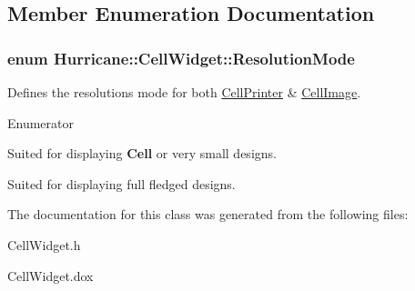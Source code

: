 \subsection{Member Enumeration Documentation}
\hypertarget{classHurricane_1_1CellWidget_a4b81fed78775d491c169b649870d9dd7}{
\subsubsection[{Resolution\-Mode}]{\setlength{\rightskip}{0pt plus 5cm}enum {\bf Hurricane\-::\-Cell\-Widget\-::\-Resolution\-Mode}}}\label{classHurricane_1_1CellWidget_a4b81fed78775d491c169b649870d9dd7}
Defines the resolutions mode for both \hyperlink{classHurricane_1_1CellPrinter}{Cell\-Printer} \& \hyperlink{classHurricane_1_1CellImage}{Cell\-Image}. \begin{Desc}
\item[Enumerator]\par
\begin{description}
\item[{\em 
\hypertarget{classHurricane_1_1CellWidget_a4b81fed78775d491c169b649870d9dd7af37fd1c10fd363f0ad04a94dbccd5789}{Res\-\_\-\-Cell\-Mode}\label{classHurricane_1_1CellWidget_a4b81fed78775d491c169b649870d9dd7af37fd1c10fd363f0ad04a94dbccd5789}
}]Suited for displaying {\bf Cell} or very small designs. \item[{\em 
\hypertarget{classHurricane_1_1CellWidget_a4b81fed78775d491c169b649870d9dd7a0c7c9bd939930fe178b5b8bcd84bdc1e}{Res\-\_\-\-Design\-Mode}\label{classHurricane_1_1CellWidget_a4b81fed78775d491c169b649870d9dd7a0c7c9bd939930fe178b5b8bcd84bdc1e}
}]Suited for displaying full fledged designs. \end{description}
\end{Desc}


The documentation for this class was generated from the following files\-:\begin{DoxyCompactItemize}
\item 
Cell\-Widget.\-h\item 
Cell\-Widget.\-dox\end{DoxyCompactItemize}
